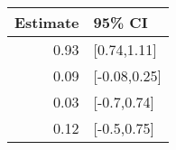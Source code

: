 \begin{tabular}{rl}
  \hline
Estimate & 95\% CI \\ 
  \hline
0.93 & [0.74,1.11] \\ 
  0.09 & [-0.08,0.25] \\ 
  0.03 & [-0.7,0.74] \\ 
  0.12 & [-0.5,0.75] \\ 
   \hline
\end{tabular}

